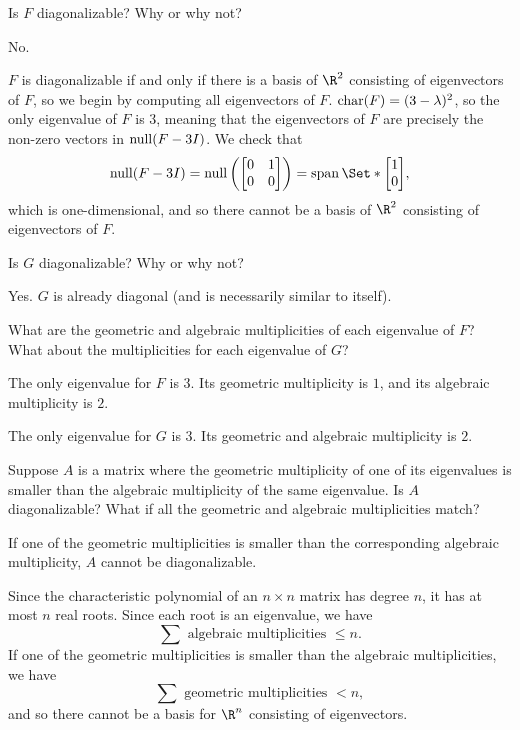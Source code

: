 	\begin{parts}
		\item Is $F$ diagonalizable?  Why or why not?
			\begin{solution}
				No.

				$F$ is diagonalizable if and only if there is a basis of $\R^2$
				consisting of eigenvectors of $F$, so we begin by computing all
				eigenvectors of $F$.
				$\operatorname{char}(F)=(3-\lambda)^2$, so the only eigenvalue of $F$ is $3$, 
				meaning that the eigenvectors of $F$ are precisely the non-zero
				vectors in $\operatorname{null}(F-3I)$. We check that 
				\[
					\Null(F-3I)
					=\Null\left(\mat{0&1\\0&0}\right)
					=\Span\Set*{\mat{1\\0}},
				\]
				which is one-dimensional, and so there cannot be a basis of $\R^2$
				consisting of eigenvectors of $F$. 
			\end{solution}
		\item Is $G$ diagonalizable?  Why or why not?
			\begin{solution}
				Yes. $G$ is already diagonal (and is necessarily similar to itself).
			\end{solution}
		\item What are the geometric and algebraic multiplicities of each eigenvalue
			of $F$? What about the multiplicities for each eigenvalue of $G$?
			\begin{solution}
				The only eigenvalue for $F$ is $3$. Its geometric multiplicity is $1$, 
				and its algebraic multiplicity is $2$. 
				
				The only eigenvalue for $G$ is $3$. Its geometric and algebraic multiplicity is $2$.
			\end{solution}
		\item Suppose $A$ is a matrix where the geometric multiplicity of one of its eigenvalues
			is smaller than the algebraic multiplicity of the same eigenvalue.  Is
			$A$ diagonalizable?  What if all the geometric and algebraic multiplicities
			match?
		\begin{solution}
				If one of the geometric multiplicities is smaller than the corresponding
				algebraic multiplicity, $A$ cannot be diagonalizable. 
				
				Since the characteristic polynomial of an $n\times n$ matrix has degree $n$,
				it has at most $n$ real roots. Since each root is an eigenvalue, we have
				\[
					\sum \text{ algebraic multiplicities }\leq n.
				\]
				If one of the geometric multiplicities is smaller than the algebraic multiplicities,
				we have
				\[
					\sum \text{ geometric multiplicities } < n,
				\]
				and so there cannot be a basis for $\R^n$ consisting of eigenvectors.


\end{solution}
\end{parts}
